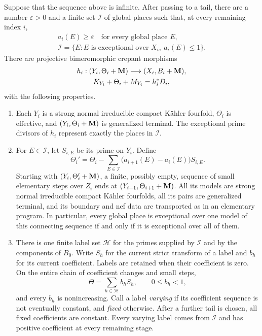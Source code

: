 \begin{proposition}\label{prop:terminal-junctions}
Suppose that the sequence above is infinite.  After passing to a tail,
there are a number $\varepsilon>0$ and a finite set $\mathcal I$ of global
places such that, at every remaining index $i$,
\begin{equation}\label{eq:stable-low-places}
 \begin{gathered}
 a_i(E)\geq\varepsilon\quad\text{for every global place }E,
 \\
 \mathcal I=
 \{E:E\text{ is exceptional over }X_i,\ a_i(E)\leq 1\}.
 \end{gathered}
\end{equation}
There are projective bimeromorphic crepant morphisms
\begin{equation}\label{eq:terminal-junction}
 \begin{gathered}
 h_i:(Y_i,\Theta_i+\mathbf{M})\longrightarrow (X_i,B_i+\mathbf{M}),
 \\
 K_{Y_i}+\Theta_i+M_{Y_i}=h_i^*D_i,
 \end{gathered}
\end{equation}
with the following properties.
\begin{enumerate}
\item Each $Y_i$ is a strong normal irreducible compact K\"ahler fourfold,
$\Theta_i$ is effective, and
$(Y_i,\Theta_i+\mathbf{M})$ is generalized terminal.  The exceptional prime
divisors of $h_i$ represent exactly the places in $\mathcal I$.
\item For $E\in\mathcal I$, let $S_{i,E}$ be its prime on $Y_i$.  Define
\begin{equation}\label{eq:junction-coefficient-change}
 \Theta_i'=
 \Theta_i-\sum_{E\in\mathcal I}
       \bigl(a_{i+1}(E)-a_i(E)\bigr)S_{i,E}.
\end{equation}
Starting with $(Y_i,\Theta_i'+\mathbf{M})$, a finite, possibly empty, sequence
of small elementary steps over $Z_i$ ends at
$(Y_{i+1},\Theta_{i+1}+\mathbf{M})$.  All its models are strong normal irreducible
compact K\"ahler fourfolds, all its pairs are generalized
terminal, and its boundary and nef data are transported as in an elementary
program.  In particular, every global place is exceptional over one model
of this connecting sequence if and only if it is exceptional over all of
them.
\item There is one finite label set $\mathcal H$ for the primes supplied by
$\mathcal I$ and by the components of $B_0$.  Write $S_h$ for the current
strict transform of a label and $b_h$ for its current coefficient.  Labels
are retained when their coefficient is zero.  On the entire chain of
coefficient changes and small steps,
\[
                    \Theta=\sum_{h\in\mathcal H}b_hS_h,
                    \qquad 0\leq b_h<1,
\]
and every $b_h$ is nonincreasing.  Call a label \emph{varying} if its
coefficient sequence is not eventually constant, and \emph{fixed}
otherwise.  After a further tail is chosen, all fixed coefficients are
constant.  Every varying label comes from $\mathcal I$ and has positive
coefficient at every remaining stage.
\end{enumerate}
\end{proposition}

